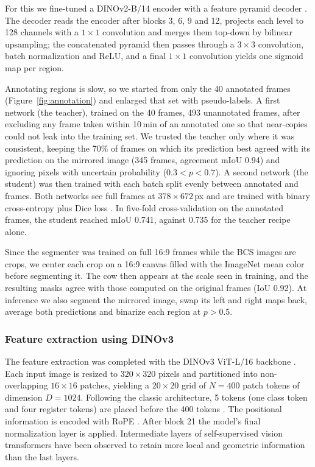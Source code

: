 For this we fine-tuned a DINOv2-B/14 encoder \citep{oquab2024dinov2} with a feature pyramid decoder \citep{lin2017fpn}.
The decoder reads the encoder after blocks 3, 6, 9 and 12, projects each level to 128 channels with a $1\times1$ convolution and merges them top-down by bilinear upsampling; the concatenated pyramid then passes through a $3\times3$ convolution, batch normalization and ReLU, and a final $1\times1$ convolution yields one sigmoid map per region.

Annotating regions is slow, so we started from only the 40 annotated frames (Figure~\ref{fig:annotation}) and enlarged that set with pseudo-labels.
A first network (the teacher), trained on the 40 frames,  493 unannotated frames, after excluding any frame taken within 10\,min of an annotated one so that near-copies could not leak into the training set.
We trusted the teacher only where it was consistent, keeping the 70\% of frames on which its prediction best agreed with its prediction on the mirrored image (345 frames, agreement mIoU 0.94) and ignoring pixels with uncertain probability ($0.3 < p < 0.7$).
A second network (the student) was then trained with each batch split evenly between annotated and  frames.
Both networks see full frames at $378\times672$\,px and are trained with binary cross-entropy plus Dice loss .
In five-fold cross-validation on the annotated frames, the student reached mIoU 0.741, against 0.735 for the teacher recipe alone.

Since the segmenter was trained on full 16:9 frames while the BCS images are crops, we center each crop on a 16:9 canvas filled with the ImageNet mean color before segmenting it.
The cow then appears at the scale seen in training, and the resulting masks agree with those computed on the original frames (IoU 0.92).
At inference we also segment the mirrored image, swap its left and right  maps back, average both predictions and binarize each region at $p > 0.5$.


\subsubsection{Feature extraction using DINOv3}
\label{sec:features}

The feature extraction was completed with the DINOv3 ViT-L/16 backbone \citep{simeoni2025dinov3}.
Each input image is resized to $320\times320$ pixels and partitioned into non-overlapping $16\times16$ patches, yielding a $20\times20$ grid of $N = 400$ patch tokens of dimension $D = 1024$.
Following the classic architecture, 5 tokens (one class token and four register tokens) are placed before the 400 tokens \citep{darcet2024registers}.
The positional information is encoded with RoPE \citep{simeoni2025dinov3}.
After block 21 the model's final normalization layer is applied.
Intermediate layers of self-supervised vision transformers have been observed to retain more local and geometric information than the last layers.


